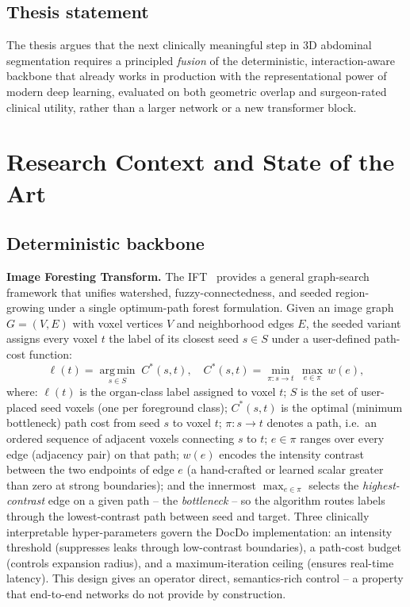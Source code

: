 \documentclass[a4paper,11pt,twoside]{article}
\begin{document}
\subsection{Thesis statement}

The thesis argues that the next clinically meaningful step in 3D abdominal
segmentation requires a principled \emph{fusion} of the deterministic,
interaction-aware backbone that already works in production with the
representational power of modern deep learning, evaluated on both geometric
overlap and surgeon-rated clinical utility, rather than a larger network or
a new transformer block.

\section{Research Context and State of the Art}

\subsection{Deterministic backbone}

\textbf{Image Foresting Transform.}
The IFT~\cite{falcao2004ift} provides a general graph-search framework that
unifies watershed, fuzzy-connectedness, and seeded region-growing under a
single optimum-path forest formulation.  Given an image graph $G=(V,E)$ with
voxel vertices $V$ and neighborhood edges $E$, the seeded variant assigns
every voxel $t$ the label of its closest seed $s \in S$ under a user-defined
path-cost function:
\[
  \ell(t) = \operatorname*{arg\,min}_{s\in S}\; C^*(s,t), \quad
  C^*(s,t) = \min_{\pi: s\to t}\, \max_{e\in\pi}\, w(e),
\]
where: $\ell(t)$ is the organ-class label assigned to voxel $t$;
$S$ is the set of user-placed seed voxels (one per foreground class);
$C^*(s,t)$ is the optimal (minimum bottleneck) path cost from seed $s$ to
voxel $t$; $\pi\colon s\to t$ denotes a path, i.e.\ an ordered sequence of
adjacent voxels connecting $s$ to $t$; $e\in\pi$ ranges over every
edge (adjacency pair) on that path; $w(e)$ encodes the intensity contrast
between the two endpoints of edge $e$ (a hand-crafted or learned scalar
greater than zero at strong boundaries); and the innermost $\max_{e\in\pi}$
selects the \emph{highest-contrast} edge on a given path -- the
\emph{bottleneck} -- so the algorithm routes labels through the
lowest-contrast path between seed and target.  Three clinically
interpretable hyper-parameters govern the DocDo implementation: an
intensity threshold (suppresses leaks through low-contrast boundaries), a
path-cost budget (controls expansion radius), and a maximum-iteration ceiling
(ensures real-time latency).  This design gives an operator direct,
semantics-rich control -- a property that end-to-end networks do not provide
by construction.
\end{document}
